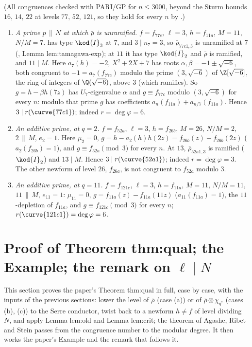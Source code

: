 \begin{example}\label{ex:modgalrep:old-examples}
(All congruences checked with PARI/GP for $n\le3000$, beyond the Sturm bounds $16$, $14$, $22$ at levels $77$, $52$, $121$, so they hold for every $n$ by .)
\begin{enumerate}[label=(\alph*)]
\item \emph{A prime $p\,\|\,N$ at which $\bar\rho$ is unramified.} $f=f_{77c}$, $\ell=3$, $h=f_{11a}$, $M=11$, $N/M=7$.  has type $\kod{I}_3$ at $7$, and $3\mid n_7=3$, so $\bar\rho_{77c1,3}$ is
unramified at $7$ (, Lemma lem:tamagawa-exp); at $11$ it has type $\kod{I}_2$ and $\bar\rho$ is ramified, and $11\mid M$. Here $a_7(h)=-2$, $X^2+2X+7$ has roots
$\alpha,\beta=-1\pm\sqrt{-6}$, both congruent to $-1=a_7(f_{77c})$ modulo the prime $(3,\sqrt{-6})$ of $\Z[\sqrt{-6}]$, the ring of integers of $\Q(\sqrt{-6})$, above $3$ (which ramifies). So
$g=h-\beta h(7z)$ has $U_7$-eigenvalue $\alpha$ and $g\equiv f_{77c}$ modulo $(3,\sqrt{-6})$ for every $n$: modulo that prime $g$ has coefficients $a_n(f_{11a})+a_{n/7}(f_{11a})$. Hence
$3\mid r(\curve{77c1})$; indeed $r=\deg\varphi=6$.
\item \emph{An additive prime, at $q=2$.} $f=f_{52a}$, $\ell=3$, $h=f_{26b}$, $M=26$, $N/M=2$, $2\,\|\,M$, $e_2=1$. Here $\mu_2=0$, $g=h-a_2(h)h(2z)=f_{26b}(z)-f_{26b}(2z)$ ($a_2(f_{26b})=1$), and
$g\equiv f_{52a}\pmod3$ for every $n$. At $13$, $\bar\rho_{52a1,3}$ is ramified ($\kod{I}_2$) and $13\mid M$. Hence $3\mid r(\curve{52a1})$; indeed $r=\deg\varphi=3$. The other newform of level $26$,
$f_{26a}$, is not congruent to $f_{52a}$ modulo $3$.
\item \emph{An additive prime, at $q=11$.} $f=f_{121c}$, $\ell=3$, $h=f_{11a}$, $M=11$, $N/M=11$, $11\,\|\,M$, $e_{11}=1$: $\mu_{11}=0$, $g=f_{11a}(z)-f_{11a}(11z)$ ($a_{11}(f_{11a})=1$), the
$11$-depletion of $f_{11a}$, and $g\equiv f_{121c}\pmod3$ for every $n$; $r(\curve{121c1})=\deg\varphi=6$.
\end{enumerate}
\end{example}

\section[Proof of Theorem thm:qual]{Proof of Theorem thm:qual; the Example; the remark on \texorpdfstring{$\ell\mid N$}{l | N}}\label{sec:modgalrep:qual}

This section proves the paper's Theorem thm:qual in full, case by case, with the inputs of the previous sections: lower the level of $\bar\rho$ (case
(a)) or of $\bar\rho\otimes\chi_{q^*}$ (cases (b), (c)) to the Serre conductor, twist back to a newform $h\ne f$ of level dividing $N$, and apply Lemma lem:old and
Lemma lem:crit; the theorem of Agashe, Ribet and Stein passes from the congruence number to the modular degree. It then works the paper's
Example and the remark that follows it.

